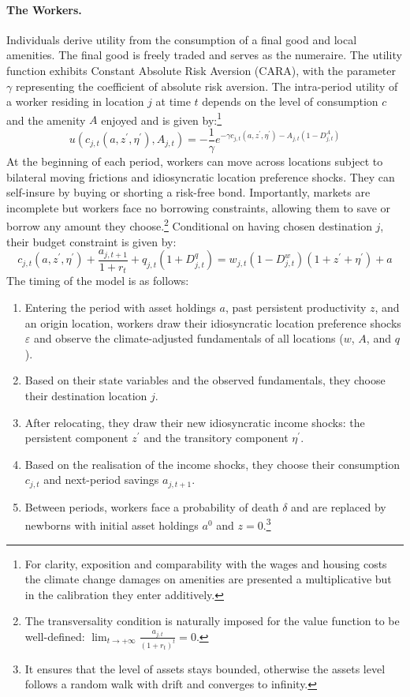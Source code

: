 \documentclass[12pt, a4paper]{article}
\begin{document}
\paragraph{The Workers.} Individuals derive utility from the consumption of a final good and local amenities. The final good is freely traded and serves as the numeraire. The utility function exhibits Constant Absolute Risk Aversion (CARA), with the parameter $\gamma$ representing the coefficient of absolute risk aversion. The intra-period utility of a worker residing in location $j$ at time $t$ depends on the level of consumption $c$ and the amenity $A$ enjoyed and is given by:\footnote{For clarity, exposition and comparability with the wages and housing costs the climate change damages on amenities are presented a multiplicative but in the calibration they enter additively.}
\begin{equation}
u(c_{j,t}(a, z^\prime, \eta^\prime), A_{j,t}) = -\frac{1}{\gamma} e^{-\gamma c_{j,t}(a, z^\prime, \eta^\prime) - A_{j,t}(1-D^A_{j,t})}
\end{equation}
At the beginning of each period, workers can move across locations subject to bilateral moving frictions and idiosyncratic location preference shocks. They can self-insure by buying or shorting a risk-free bond. Importantly, markets are incomplete but workers face no borrowing constraints, allowing them to save or borrow any amount they choose.\footnote{The transversality condition is naturally imposed for the value function to be well-defined: $\lim_{t \rightarrow +\infty}\frac{a_{j,t}}{(1 + r_t)^t} = 0$.} Conditional on having chosen destination $j$, their budget constraint is given by:
\begin{equation}
c_{j,t}(a, z^\prime, \eta^\prime) + \frac{a_{j,t+1}}{1 + r_t} + q_{j,t}(1+ D^q_{j,t}) = w_{j,t}(1-D^w_{j,t})(1 + z^\prime + \eta^\prime) + a
\end{equation}
The timing of the model is as follows: 
\begin{enumerate}
  \item Entering the period with asset holdings $a$, past persistent productivity $z$, and an origin location, workers draw their idiosyncratic location preference shocks $\varepsilon$ and observe the climate-adjusted fundamentals of all locations ($w$, $A$, and $q$).
  \item Based on their state variables and the observed fundamentals, they choose their destination location $j$.
  \item After relocating, they draw their new idiosyncratic income shocks: the persistent component $z^\prime$ and the transitory component $\eta^\prime$.
  \item Based on the realisation of the income shocks, they choose their consumption $c_{j,t}$ and next-period savings $a_{j,t+1}$.
  \item Between periods, workers face a probability of death $\delta$ and are replaced by newborns with initial asset holdings $a^0$ and $z = 0$.\footnote{It ensures that the level of assets stays bounded, otherwise the assets level follows a random walk with drift and converges to infinity.}
\end{enumerate}
\end{document}
